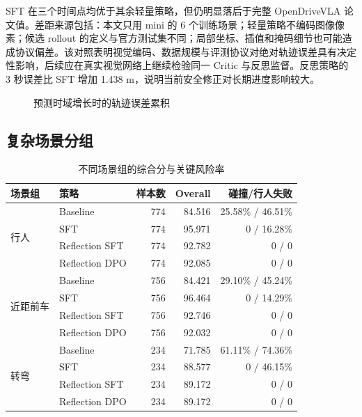 \documentclass[UTF8,a4paper,12pt,fontset=fandol]{ctexart}
\begin{document}
SFT 在三个时间点均优于其余轻量策略，但仍明显落后于完整 OpenDriveVLA 论文值。差距来源包括：本文只用 mini 的 6 个训练场景；轻量策略不编码图像像素；候选 rollout 的定义与官方测试集不同；局部坐标、插值和掩码细节也可能造成协议偏差。该对照表明视觉编码、数据规模与评测协议对绝对轨迹误差具有决定性影响，后续应在真实视觉网络上继续检验同一 Critic 与反思监督。反思策略的 3 秒误差比 SFT 增加 1.438 m，说明当前安全修正对长期进度影响较大。

\begin{figure}[!htbp]
\centering
{}
\caption{预测时域增长时的轨迹误差累积}
\end{figure}

\subsection{复杂场景分组}
\begin{table}[!htbp]
\centering\scriptsize
\caption{不同场景组的综合分与关键风险率}
\begin{tabular}{llrrr}
\toprule
场景组 & 策略 & 样本数 & Overall & 碰撞/行人失败 \\
\midrule
\multirow{4}{*}{行人} & Baseline & 774 & 84.516 & 25.58\% / 46.51\% \\
 & SFT & 774 & 95.971 & 0 / 16.28\% \\
 & Reflection SFT & 774 & 92.782 & 0 / 0 \\
 & Reflection DPO & 774 & 92.085 & 0 / 0 \\
\midrule
\multirow{4}{*}{近距前车} & Baseline & 756 & 84.421 & 29.10\% / 45.24\% \\
 & SFT & 756 & 96.464 & 0 / 14.29\% \\
 & Reflection SFT & 756 & 92.746 & 0 / 0 \\
 & Reflection DPO & 756 & 92.032 & 0 / 0 \\
\midrule
\multirow{4}{*}{转弯} & Baseline & 234 & 71.785 & 61.11\% / 74.36\% \\
 & SFT & 234 & 88.577 & 0 / 46.15\% \\
 & Reflection SFT & 234 & 89.172 & 0 / 0 \\
 & Reflection DPO & 234 & 89.172 & 0 / 0 \\
\bottomrule
\end{tabular}
\end{table}
\end{document}
